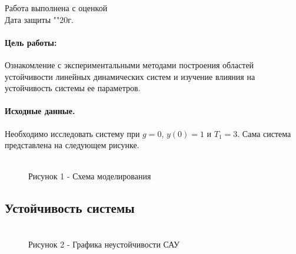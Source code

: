 \documentclass[a4paper, 12pt]{article}
\begin{document}
\begin{titlepage}
		Работа выполнена с оценкой \hspace{1cm} \underline{\hspace{8cm}} \\ 
		\vspace{1cm}
		Дата защиты "\underline{\hspace{0.7cm}}"\hspace{0.2cm}\underline{\hspace{2cm}}\hspace{0.2cm}20\underline{\hspace{0.7cm}}г.

	\end{titlepage}


\paragraph{Цель работы: }Ознакомление с экспериментальными методами построения областей устойчивости линейных динамических систем и изучение влияния на устойчивость системы ее параметров.

\paragraph{Исходные данные.} Необходимо исследовать систему при $g = 0$, $y(0) = 1$ и $T_1 = 3$. Сама система представлена на следующем рисунке.


\begin{figure}[h]
	
	\\
	\centering Рисунок 1 - Схема моделирования
	
\end{figure}
\clearpage
\begin{center}
	\section{Устойчивость системы}\hfill\par
\end{center}


\begin{figure}[h]

	\\
		\centering Рисунок 2 - Графика неустойчивости САУ
\end{figure}
\end{document}
